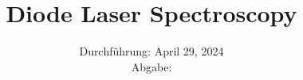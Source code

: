 

\subject{\texorpdfstring{\vspace{2ex}}{}V60\texorpdfstring{\vspace{-2ex}}{}} %
\title{Diode Laser Spectroscopy} %
\date{
	Durchführung: April 29, 2024 %
	\\ Abgabe:  %
}




\maketitle
\thispagestyle{empty}


\tableofcontents
\newpage








\enlargethispage{2\baselineskip}\printbibliography{}\pagebreak

\newpage



